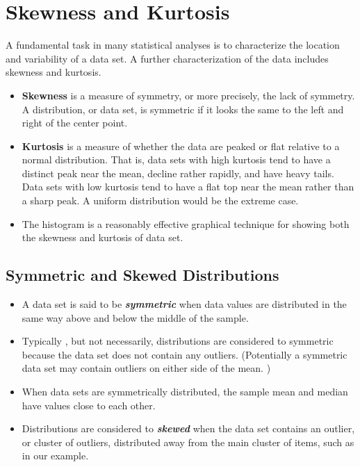 

%
%
%




\section*{Skewness and Kurtosis}

A fundamental task in many statistical analyses is to characterize the location and variability of a data set. A further characterization of the data includes skewness and kurtosis. 

\begin{itemize}
\item \textbf{Skewness} is a measure of symmetry, or more precisely, the lack of symmetry. A distribution, or data set, is symmetric if it looks the same to the left and right of the center point.

\item \textbf{Kurtosis} is a measure of whether the data are peaked or flat relative to a normal distribution. That is, data sets with high kurtosis tend to have a distinct peak near the mean, decline rather rapidly, and have heavy tails. Data sets with low kurtosis tend to have a flat top near the mean rather than a sharp peak. A uniform distribution would be the extreme case.

\item The histogram is a reasonably effective graphical technique for showing both the skewness and kurtosis of data set.


\end{itemize}


\subsection{Symmetric and Skewed Distributions }
\begin{itemize}
\item  A data set is said to be \textbf{\emph{symmetric}} when data values are distributed in the same way above and below the middle of the sample.
\item Typically , but not necessarily, distributions are considered to symmetric because the data set does not contain any outliers. (Potentially a symmetric data set may contain outliers on either side of the mean. )
\item When data sets are symmetrically distributed, the sample mean and median have values close to each other.
\item Distributions are considered to \textbf{\emph{skewed}} when the data set contains an outlier, or cluster of outliers, distributed away from the main cluster of items, such as in our example.

\end{itemize}


